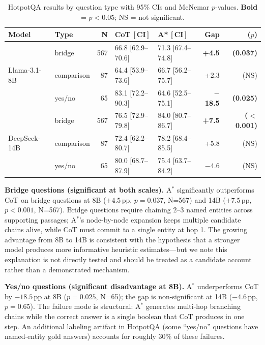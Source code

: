 \documentclass{article}
\newcommand{\astar}{A$^*$\xspace}
\begin{document}
\begin{table}[h]
\centering
\caption{HotpotQA results by question type with 95\% CIs and McNemar $p$-values.
  \textbf{Bold} = $p<0.05$; NS = not significant.}
\label{tab:qtype}
\small
\begin{tabular}{llrllrr}
\toprule
Model & Type & N & CoT [\,CI\,] & A* [\,CI\,] & Gap & ($p$) \\
\midrule
\multirow{3}{*}{Llama-3.1-8B}
  & bridge     & 567 & 66.8 [62.9--70.6] & 71.3 [67.4--74.8] & \textbf{+4.5} & \textbf{(0.037)} \\
  & comparison &  87 & 64.4 [53.9--73.6] & 66.7 [56.2--75.7] & +2.3  & (NS) \\
  & yes/no     &  65 & 83.1 [72.2--90.3] & 64.6 [52.5--75.1] & \textbf{$-$18.5} & \textbf{(0.025)} \\
\midrule
\multirow{3}{*}{DeepSeek-14B}
  & bridge     & 567 & 76.5 [72.9--79.8] & 84.0 [80.7--86.7] & \textbf{+7.5} & \textbf{($<$0.001)} \\
  & comparison &  87 & 72.4 [62.2--80.7] & 78.2 [68.4--85.5] & +5.8  & (NS) \\
  & yes/no     &  65 & 80.0 [68.7--87.9] & 75.4 [63.7--84.2] & $-$4.6 & (NS) \\
\bottomrule
\end{tabular}
\end{table}

\textbf{Bridge questions (significant at both scales).}
\astar significantly outperforms CoT on bridge questions at 8B ($+4.5$\,pp, $p=0.037$, N=567) and 14B ($+7.5$\,pp, $p<0.001$, N=567).
Bridge questions require chaining 2--3 named entities across supporting passages; \astar's node-by-node expansion keeps multiple candidate chains alive, while CoT must commit to a single entity at hop 1.
The growing advantage from 8B to 14B is consistent with the hypothesis that a stronger model produces more informative heuristic estimates---but we note this explanation is not directly tested and should be treated as a candidate account rather than a demonstrated mechanism.

\textbf{Yes/no questions (significant disadvantage at 8B).}
\astar underperforms CoT by $-18.5$\,pp at 8B ($p=0.025$, N=65); the gap is non-significant at 14B ($-4.6$\,pp, $p=0.65$).
The failure mode is structural: \astar generates multi-hop branching chains while the correct answer is a single boolean that CoT produces in one step.
An additional labeling artifact in HotpotQA (some ``yes/no'' questions have named-entity gold answers) accounts for roughly 30\% of these failures.
\end{document}
